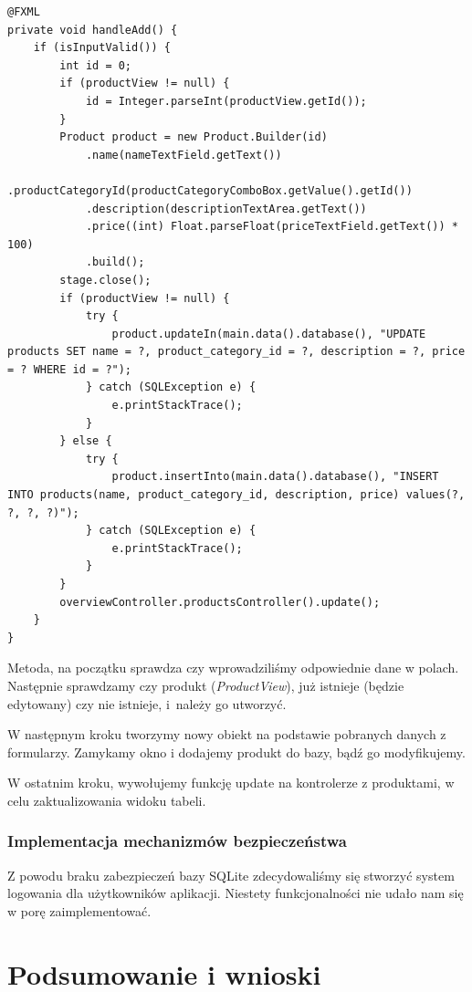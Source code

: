 \begin{lstlisting}[style=Java]
@FXML
private void handleAdd() {
	if (isInputValid()) {
		int id = 0;
		if (productView != null) {
			id = Integer.parseInt(productView.getId());
		}
		Product product = new Product.Builder(id)
			.name(nameTextField.getText())
			.productCategoryId(productCategoryComboBox.getValue().getId())
			.description(descriptionTextArea.getText())
			.price((int) Float.parseFloat(priceTextField.getText()) * 100)
			.build();
		stage.close();
		if (productView != null) {
			try {
				product.updateIn(main.data().database(), "UPDATE products SET name = ?, product_category_id = ?, description = ?, price = ? WHERE id = ?");
			} catch (SQLException e) {
				e.printStackTrace();
			}
		} else {
			try {
				product.insertInto(main.data().database(), "INSERT INTO products(name, product_category_id, description, price) values(?, ?, ?, ?)");
			} catch (SQLException e) {
				e.printStackTrace();
			}
		}
		overviewController.productsController().update();
	}
}
\end{lstlisting}

Metoda, na początku sprawdza czy wprowadziliśmy odpowiednie dane w polach. Następnie sprawdzamy czy produkt (\emph{ProductView}), już istnieje (będzie edytowany) czy nie istnieje, i~należy go utworzyć.

W następnym kroku tworzymy nowy obiekt na podstawie pobranych danych z formularzy. Zamykamy okno i dodajemy produkt do bazy, bądź go modyfikujemy.

W ostatnim kroku, wywołujemy funkcję update na kontrolerze z produktami, w celu zaktualizowania widoku tabeli.

\subsubsection{Implementacja mechanizmów bezpieczeństwa}

Z powodu braku zabezpieczeń bazy SQLite zdecydowaliśmy się stworzyć system logowania dla użytkowników aplikacji. Niestety funkcjonalności nie udało nam się w porę zaimplementować.

\section{Podsumowanie i wnioski}

